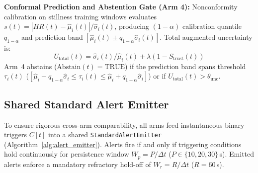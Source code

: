 \documentclass[conference]{IEEEtran}
\begin{document}
\textbf{Conformal Prediction and Abstention Gate (Arm 4):}
Nonconformity calibration on stillness training windows evaluates $s(t) = |HR(t) - \hat{\mu}_i(t)| / \hat{\sigma}_i(t)$, producing $(1-\alpha)$ calibration quantile $q_{1-\alpha}$ and prediction band $[\hat{\mu}_i(t) \pm q_{1-\alpha}\hat{\sigma}_i(t)]$. Total augmented uncertainty is:
\begin{equation}
U_{\text{total}}(t) = \hat{\sigma}_i(t) / \hat{\mu}_i(t) + \lambda\left(1 - S_{\text{trust}}(t)\right)
\label{eq:conformal_unc}
\end{equation}
Arm~4 abstains ($\text{Abstain}(t) = \text{TRUE}$) if the prediction band spans threshold $\tau_i(t)$ ($[\hat{\mu}_i - q_{1-\alpha}\hat{\sigma}_i \le \tau_i(t) \le \hat{\mu}_i + q_{1-\alpha}\hat{\sigma}_i]$) or if $U_{\text{total}}(t) > \theta_{\text{unc}}$.



\subsection{Shared Standard Alert Emitter}
To ensure rigorous cross-arm comparability, all arms feed instantaneous binary triggers $C[t]$ into a shared \texttt{StandardAlertEmitter} (Algorithm~\ref{alg:alert_emitter}). Alerts fire if and only if triggering conditions hold continuously for persistence window $W_p = P / \Delta t$ ($P \in \{10, 20, 30\}$\,s). Emitted alerts enforce a mandatory refractory hold-off of $W_r = R / \Delta t$ ($R = 60$\,s).
\end{document}
